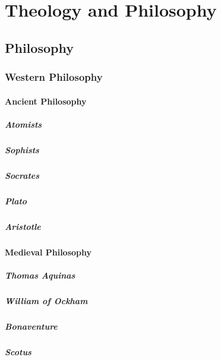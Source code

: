 \chapter{Theology and Philosophy}	
	\section{Philosophy}
		\subsection{Western Philosophy}
		\subsubsection{Ancient Philosophy}
			\paragraph{Atomists}
			\paragraph{Sophists}
			\paragraph{Socrates}
			\paragraph{Plato}
			\paragraph{Aristotle}
		\subsubsection{Medieval Philosophy}
			\paragraph{Thomas Aquinas}
			\paragraph{William of Ockham}
			\paragraph{Bonaventure}
			\paragraph{Scotus}
